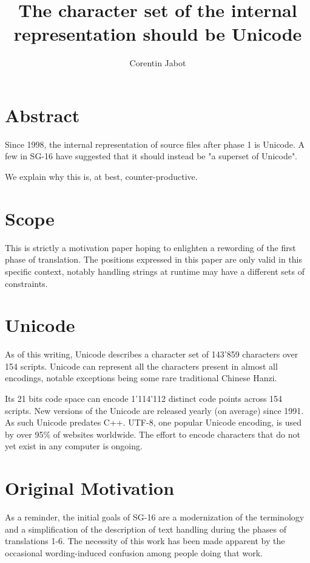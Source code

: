 \documentclass{wg21}
\title{The character set of the internal representation should be Unicode}
\author{Corentin Jabot}{corentin.jabot@gmail.com}
\begin{document}
\maketitle



\section{Abstract}

Since 1998, the internal representation of source files after phase 1 is Unicode.
A few in SG-16 have suggested that it should instead be "a superset of Unicode".

We explain why this is, at best, counter-productive.

\section{Scope}

This is strictly a motivation paper hoping to enlighten a rewording of the first phase of translation.
The positions expressed in this paper are only valid in this specific context,
notably handling strings at runtime may have a different sets of constraints.

\section{Unicode}

As of this writing, Unicode describes a character set of 143'859 characters over 154 scripts.
Unicode can represent all the characters present in almost all encodings, notable exceptions being some rare traditional Chinese Hanzi.

Its 21 bits code space can encode 1'114'112 distinct code points across 154 scripts. New versions of the Unicode are released yearly (on average) since 1991.
As such Unicode predates C++. UTF-8, one popular Unicode encoding, is used by over 95\% of websites worldwide.
The effort to encode characters that do not yet exist in any computer is ongoing.

\section{Original Motivation}

As a reminder, the initial goals of SG-16 are a modernization of the terminology and a simplification
of the description of text handling during the phases of translations 1-6.
The necessity of this work has been made apparent by the occasional wording-induced confusion among people
doing that work.
\end{document}
